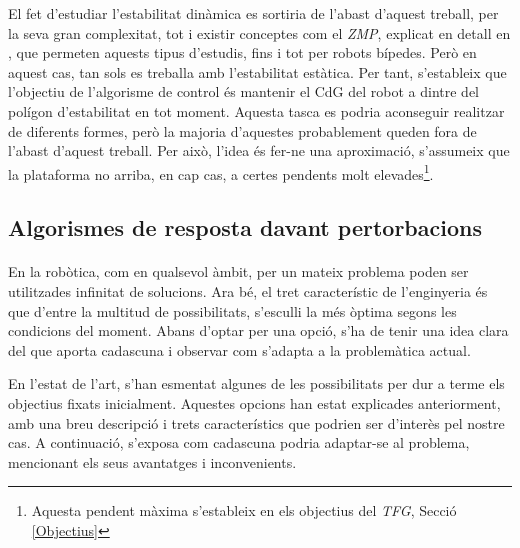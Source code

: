 \documentclass[12pt,a4paper,final,twoside]{article}
\begin{document}
El fet d'estudiar l'estabilitat dinàmica es sortiria de l'abast d'aquest treball, per la seva gran complexitat, tot i existir conceptes com el \textit{ZMP}, explicat en detall en \cite{Vukobratovic2004}, que permeten aquests tipus d'estudis, fins i tot per robots bípedes. Però en aquest cas, tan sols es treballa amb l'estabilitat estàtica. Per tant, s'estableix que l'objectiu de l'algorisme de control és mantenir el CdG del robot a dintre del polígon d'estabilitat en tot moment. Aquesta tasca es podria aconseguir realitzar de diferents formes, però la majoria d'aquestes probablement queden fora de l'abast d'aquest treball. Per això, l'idea és fer-ne una aproximació, s'assumeix que la plataforma no arriba, en cap cas, a certes pendents molt elevades\footnote{Aquesta pendent màxima s'estableix en els objectius del \textit{TFG}, Secció \ref{Objectius}}.




\subsection{Algorismes de resposta davant pertorbacions}
\label{Algorismes}

\paragraph{}En la robòtica, com en qualsevol àmbit, per un mateix problema poden ser utilitzades infinitat de solucions. Ara bé, el tret característic de l'enginyeria és que d'entre la multitud de possibilitats, s'esculli la més òptima segons les condicions del moment. Abans d'optar per una opció, s'ha de tenir una idea clara del que aporta cadascuna i observar com s'adapta a la problemàtica actual.

En l'estat de l'art, s'han esmentat algunes de les possibilitats per dur a terme els objectius fixats inicialment. Aquestes opcions han estat explicades anteriorment, amb una breu descripció i trets característics que podrien ser d'interès pel nostre cas. A continuació, s'exposa com cadascuna podria adaptar-se al problema, mencionant els seus avantatges i inconvenients.
\end{document}
